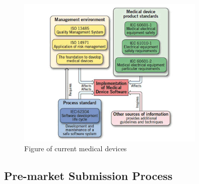 \begin{figure}[t]
		\centering
		\includegraphics[width=0.8\textwidth]{figs/standards.jpg}
		\caption{\small Figure of current medical devices}
		\label{fig:Cur}
\end{figure}
\subsection{Pre-market Submission Process}

